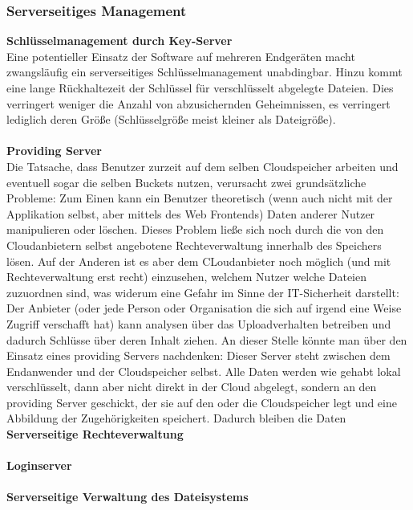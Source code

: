 \documentclass[12pt,a4paper,bibliography=totocnumbered,listof=totocnumbered]{scrartcl}
\begin{document}
\subsubsection{Serverseitiges Management}
\textbf{Schlüsselmanagement durch Key-Server}\\
Eine potentieller Einsatz der Software auf mehreren Endgeräten macht zwangsläufig ein serverseitiges Schlüsselmanagement unabdingbar. Hinzu kommt eine lange Rückhaltezeit der Schlüssel für verschlüsselt abgelegte Dateien. Dies verringert weniger die Anzahl von abzusichernden Geheimnissen, es verringert lediglich deren Größe (Schlüsselgröße meist kleiner als Dateigröße).\\ \cite{38}
\\\textbf{Providing Server}\\
Die Tatsache, dass Benutzer zurzeit auf dem selben Cloudspeicher arbeiten und eventuell sogar die selben Buckets nutzen, verursacht zwei grundsätzliche Probleme: Zum Einen kann ein Benutzer theoretisch (wenn auch nicht mit der Applikation selbst, aber mittels des Web Frontends) Daten anderer Nutzer manipulieren oder löschen. Dieses Problem ließe sich noch durch die von den Cloudanbietern selbst angebotene Rechteverwaltung innerhalb des Speichers lösen. Auf der Anderen ist es aber dem CLoudanbieter noch möglich (und mit Rechteverwaltung erst recht) einzusehen, welchem Nutzer welche Dateien zuzuordnen sind, was widerum eine Gefahr im Sinne der IT-Sicherheit darstellt: Der Anbieter (oder jede Person oder Organisation die sich auf irgend eine Weise Zugriff verschafft hat) kann analysen über das Uploadverhalten betreiben und dadurch Schlüsse über deren Inhalt ziehen. An dieser Stelle könnte man über den Einsatz eines providing Servers nachdenken: Dieser Server steht zwischen dem Endanwender und der Cloudspeicher selbst. Alle Daten werden wie gehabt lokal verschlüsselt, dann aber nicht direkt in der Cloud abgelegt, sondern an den providing Server geschickt, der sie auf den oder die Cloudspeicher legt und eine Abbildung der Zugehörigkeiten speichert. Dadurch bleiben die Daten  
\\\textbf{Serverseitige Rechteverwaltung}\\
\\\textbf{Loginserver}\\
\\\textbf{Serverseitige Verwaltung des Dateisystems}\\
\end{document}
